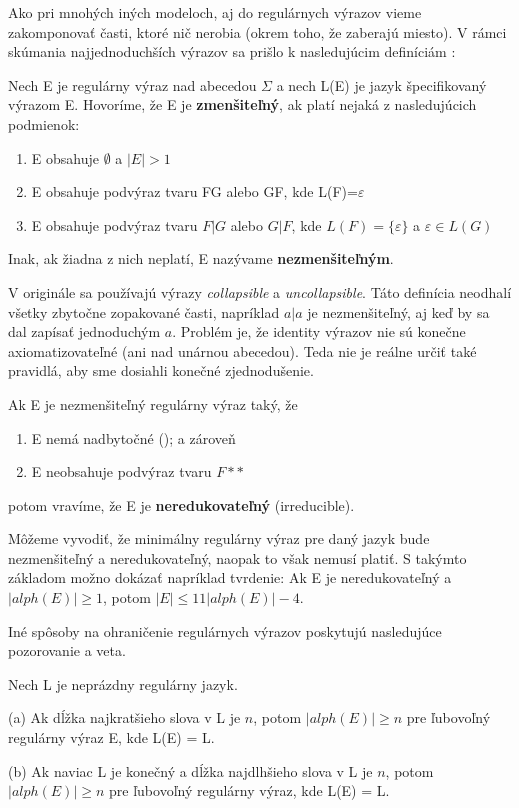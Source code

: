 Ako pri mnohých iných modeloch, aj do regulárnych výrazov vieme zakomponovať časti, ktoré nič nerobia (okrem toho, že zaberajú miesto). V rámci skúmania najjednoduchších výrazov sa prišlo k nasledujúcim definíciám \cite{newResults}:

\begin{df}
Nech E je regulárny výraz nad abecedou $\Sigma$ a nech L(E) je jazyk špecifikovaný výrazom E. Hovoríme, že E je \textbf{zmenšiteľný}, ak platí nejaká z nasledujúcich podmienok:
\begin{enumerate}
\item E obsahuje $\emptyset$ a $|E|>1$
\item E obsahuje podvýraz tvaru FG alebo GF, kde L(F)={$\varepsilon$}
\item E obsahuje podvýraz tvaru $F|G$ alebo $G|F$, kde $L(F)=\lbrace \varepsilon \rbrace$ a $\varepsilon \in L(G)$
\end{enumerate}
Inak, ak žiadna z nich neplatí, E nazývame \textbf{nezmenšiteľným}.
\end{df}

V originále sa používajú výrazy \textit{collapsible} a \textit{uncollapsible}. Táto definícia neodhalí všetky zbytočne zopakované časti, napríklad $a|a$ je nezmenšiteľný, aj keď by sa dal zapísať jednoduchým $a$. Problém je, že identity výrazov nie sú konečne axiomatizovateľné (ani nad unárnou abecedou)\cite{newResults}. Teda nie je reálne určiť také pravidlá, aby sme dosiahli konečné zjednodušenie. 

\begin{df}
Ak E je nezmenšiteľný regulárny výraz taký, že
\begin{enumerate}
\item E nemá nadbytočné (); a zároveň
\item E neobsahuje podvýraz tvaru $F**$
\end{enumerate}
potom vravíme, že E je \textbf{neredukovateľný} (irreducible).
\end{df}

Môžeme vyvodiť, že minimálny regulárny výraz pre daný jazyk bude nezmenšiteľný a neredukovateľný, naopak to však nemusí platiť. S takýmto základom možno dokázať napríklad tvrdenie: Ak E je neredukovateľný a $|alph(E)| \geq 1$, potom $|E| \leq 11|alph(E)| - 4$.

Iné spôsoby na ohraničenie regulárnych výrazov poskytujú nasledujúce pozorovanie a veta.

\begin{veta}
Nech L je neprázdny regulárny jazyk.

(a) Ak dĺžka najkratšieho slova v L je $n$, potom $|alph(E)| \geq n$ pre ľubovoľný regulárny výraz E, kde L(E) = L.

(b) Ak naviac L je konečný a dĺžka najdlhšieho slova v L je $n$, potom $|alph(E)| \geq n$ pre ľubovoľný regulárny výraz, kde L(E) = L.
\end{veta}


